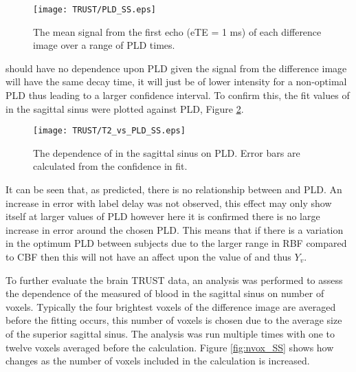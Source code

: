\begin{figure}[H]
	\centering
	\texttt{[image: TRUST/PLD\_SS.eps]}
	\caption{The mean signal from the first echo (\ac{eTE} = 1 ms) of each difference image over a range of \ac{PLD} times.}
	\label{fig:Sig_vs_PLD_SS}	
\end{figure}

\ttwo should have no dependence upon \ac{PLD} given the signal from the difference image will have the same decay time, it will just be of lower intensity for a non-optimal \ac{PLD} thus leading to a larger confidence interval. To confirm this, the fit values of \ttwo in the sagittal sinus were plotted against \ac{PLD}, Figure \ref{fig:SS_T2vsPLD}.

\begin{figure}[H]
	\centering
	\texttt{[image: TRUST/T2\_vs\_PLD\_SS.eps]}
	\caption{The dependence of \ttwo in the sagittal sinus on \ac{PLD}. Error bars are calculated from the confidence in \ttwo fit.}
	\label{fig:SS_T2vsPLD}	
\end{figure}

It can be seen that, as predicted, there is no relationship between \ttwo and \ac{PLD}. An increase in error with label delay was not observed, this effect may only show itself at larger values of \ac{PLD} however here it is confirmed there is no large increase in error around the chosen \ac{PLD}. This means that if there is a variation in the optimum \ac{PLD} between subjects due to the larger range in \ac{RBF} compared to \ac{CBF} then this will not have an affect upon the value of \ttwo and thus $Y_v$.

To further evaluate the brain \ac{TRUST} data, an analysis was performed to assess the dependence of the measured \ttwo of blood in the sagittal sinus on number of voxels. Typically the four brightest voxels of the difference image are averaged before the fitting occurs, this number of voxels is chosen due to the average size of the superior sagittal sinus. The analysis was run multiple times with one to twelve voxels averaged before the calculation. Figure \ref{fig:nvox_SS} shows how \ttwo changes as the number of voxels included in the calculation is increased.

